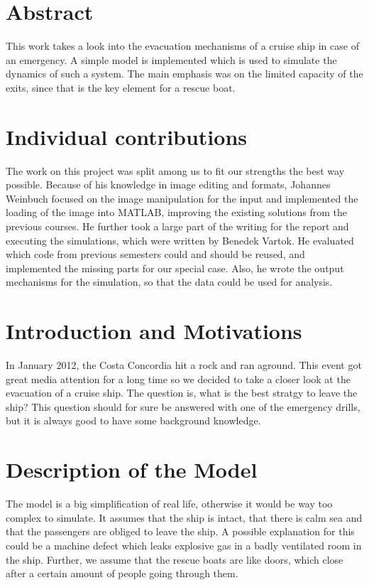 \documentclass[11pt]{article}
\begin{document}
\section{Abstract}

This work takes a look into the evacuation mechanisms of a cruise ship in case
of an emergency.  A simple model is implemented which is used to simulate the
dynamics of such a system.  The main emphasis was on the limited capacity of
the exits, since that is the key element for a rescue boat. 


\section{Individual contributions}

The work on this project was split among us to fit our strengths the best way
possible.  Because of his knowledge in image editing and formats, Johannes
Weinbuch focused on the image manipulation for the input and implemented the
loading of the image into MATLAB, improving the existing solutions from the
previous courses. He further took a large part of the writing for the report
and executing the simulations, which were written by Benedek Vartok.  He
evaluated which code from previous semesters could and should be reused, and
implemented the missing parts for our special case.  Also, he wrote the output
mechanisms for the simulation, so that the data could be used for analysis.


\section{Introduction and Motivations}

In January 2012, the Costa Concordia hit a rock and ran aground\cite{bbcnews}.
This event got great media attention for a long time so we decided to take a
closer look at the evacuation of a cruise ship.  The question is, what is the
best stratgy to leave the ship?  This question should for sure be answered with
one of the emergency drills, but it is always good to have some background
knowledge.


\section{Description of the Model}

The model is a big simplification of real life, otherwise it would be way too
complex to simulate.  It assumes that the ship is intact, that there is calm
sea and that the passengers are obliged to leave the ship.  A possible
explanation for this could be a machine defect which leaks explosive gas in a
badly ventilated room in the ship.  Further, we assume that the rescue boats are
like doors, which close after a certain amount of people going through them. 
\end{document}
